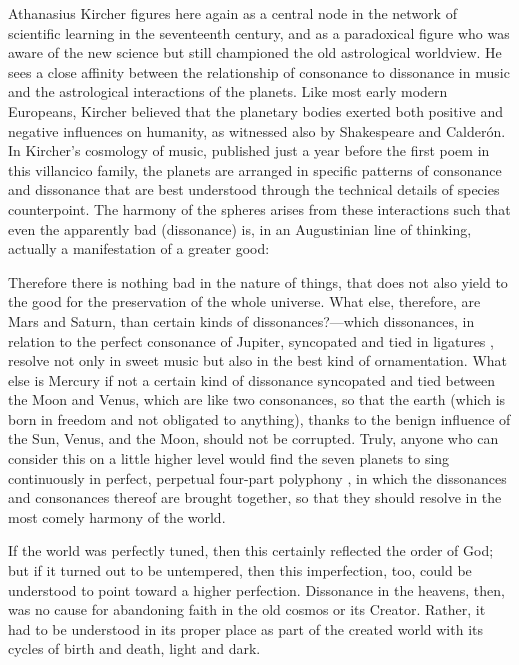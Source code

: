 Athanasius Kircher figures here again as a central node in the network of
scientific learning in the seventeenth century, and as a paradoxical figure who
was aware of the new science but still championed the old astrological
worldview.
He sees a close affinity between the relationship of consonance to dissonance
in music and the astrological interactions of the planets.
Like most early modern Europeans, Kircher believed that the planetary bodies
exerted both positive and negative influences on humanity, as witnessed also by
Shakespeare and Calderón.
In Kircher's cosmology of music, published just a year before the first poem in
this villancico family, the planets are arranged in specific patterns of
consonance and dissonance that are best understood through the technical
details of species counterpoint.
The harmony of the spheres arises from these interactions such that even the
apparently bad (dissonance) is, in an Augustinian line of thinking, actually a
manifestation of a greater good:
\begin{quoting}
	Therefore there is nothing bad in the nature of things, that does not
	also yield to the good for the preservation of the whole universe.
	What else, therefore, are Mars and Saturn, than certain kinds of
        dissonances?---which dissonances, in relation to the perfect consonance
        of Jupiter, syncopated and tied in ligatures , resolve
        not only in sweet music but also in the best kind of ornamentation.
	What else is Mercury if not a certain kind of dissonance syncopated and
	tied between the Moon and Venus, which are like two consonances, so that
	the earth (which is born in freedom and not obligated to anything),
	thanks to the benign influence of the Sun, Venus, and the Moon, should
	not be corrupted.
	Truly, anyone who can consider this on a little higher level would find
	the seven planets to sing continuously in perfect, perpetual four-part
	polyphony , in which the dissonances and
	consonances thereof are brought together, so that they should resolve in
	the most comely harmony of the world.%
        \Autocite[, 383--384]{Kircher:Musurgia}
\end{quoting}

If the world was perfectly tuned, then this certainly reflected the order of
God; but if it turned out to be untempered, then this imperfection, too, could
be understood to point toward a higher perfection.  
Dissonance in the heavens, then, was no cause for abandoning faith in the old
cosmos or its Creator.  
Rather, it had to be understood in its proper place as part of the created
world with its cycles of birth and death, light and dark.


